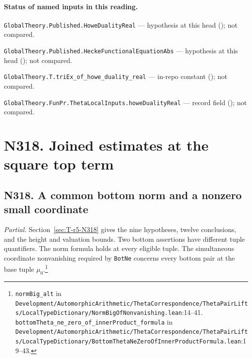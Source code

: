 
\paragraph{Status of named inputs in this reading.}
\noindent\nolinkurl{GlobalTheory.Published.HoweDualityReal} --- hypothesis at this head (); not compared.\par
\noindent\nolinkurl{GlobalTheory.Published.HeckeFunctionalEquationAbs} --- hypothesis at this head (); not compared.\par
\noindent\nolinkurl{GlobalTheory.T.triEx_of_howe_duality_real} --- in-repo constant (); not compared.\par
\noindent\nolinkurl{GlobalTheory.FunPr.ThetaLocalInputs.howeDualityReal} --- record field (); not compared.\par

\section*{N318. Joined estimates at the square top term}

\subsection{N318. A common bottom norm and a nonzero small coordinate}\label{r6:N318}
\textit{Partial.} Section~\ref{sec:T-r5-N318} gives the nine hypotheses, twelve conclusions, and the height and valuation bounds. Two bottom assertions have different tuple quantifiers. The norm formula holds at every eligible tuple. The simultaneous coordinate nonvanishing required by \nolinkurl{BotNe} concerns every bottom pair at the base tuple $\mu_0$.\footnote{\nolinkurl{normBig_alt} in \nolinkurl{Development/AutomorphicArithmetic/ThetaCorrespondence/ThetaPairLifts/LocalTypeDictionary/NormBigOfNonvanishing.lean}\allowbreak:14--41. \nolinkurl{bottomTheta_ne_zero_of_innerProduct_formula} in \nolinkurl{Development/AutomorphicArithmetic/ThetaCorrespondence/ThetaPairLifts/LocalTypeDictionary/BottomThetaNeZeroOfInnerProductFormula.lean}\allowbreak:19--43.}

